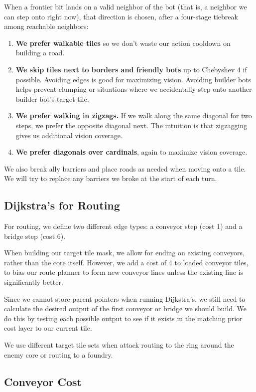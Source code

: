 \documentclass[10pt,sigconf,nonacm]{acmart}
\begin{document}
When a frontier bit lands on a valid neighbor of the bot
(that is, a neighbor we can step onto right now), that direction is chosen, after a four-stage
tiebreak among reachable neighbors:

\begin{enumerate}
  \item \textbf{We prefer walkable tiles} so we don't waste our action cooldown on building a road.
  \item \textbf{We skip tiles next to borders and friendly bots} up to Chebyshev 4 if possible. Avoiding edges is good for maximizing vision. Avoiding builder bots helps prevent clumping or situations where we accidentally step onto another builder bot's target tile.
  \item \textbf{We prefer walking in zigzags.} If we walk along the same diagonal for two steps, we prefer the opposite diagonal next. The intuition is that zigzagging gives us additional vision coverage.
  \item \textbf{We prefer diagonals over cardinals}, again to maximize vision coverage.
\end{enumerate}

We also break ally barriers and place roads as needed when moving onto a tile. We will try to replace any barriers we broke at the start of each turn.

\subsection{Dijkstra's for Routing}

For routing, we define two different edge types: a conveyor step (cost 1) and a bridge step (cost 6).

When building our target tile mask, we allow for ending on existing conveyors, rather than the core itself. However, we add a cost of 4 to loaded conveyor tiles, to bias our route planner to form new conveyor lines unless the existing line is significantly better.

Since we cannot store parent pointers when running Dijkstra's, we still need to calculate the desired output of the first conveyor or bridge we should build. We do this by testing each possible output to see if it exists in the matching prior cost layer to our current tile.

We use different target tile sets when attack routing to the ring around the enemy core or routing to a foundry.

\subsection{Conveyor Cost}
\end{document}
